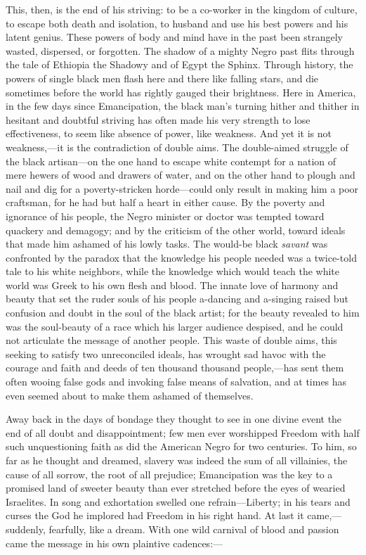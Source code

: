 This, then, is the end of his striving: to be a co-worker in the
kingdom of culture, to escape both death and isolation, to husband and
use his best powers and his latent genius. These powers of body and
mind have in the past been strangely wasted, dispersed, or forgotten.
The shadow of a mighty Negro past flits through the tale of Ethiopia
the Shadowy and of Egypt the Sphinx. Through history, the powers of
single black men flash here and there like falling stars, and die
sometimes before the world has rightly gauged their brightness. Here
in America, in the few days since Emancipation, the black man's
turning hither and thither in hesitant and doubtful striving has often
made his very strength to lose effectiveness, to seem like absence of
power, like weakness. And yet it is not weakness,---it is the
contradiction of double aims. The double-aimed struggle of the black
artisan---on the one hand to escape white contempt for a nation of
mere hewers of wood and drawers  of water, and on the other
hand to plough and nail and dig for a poverty-stricken horde---could
only result in making him a poor craftsman, for he had but half a
heart in either cause. By the poverty and ignorance of his people, the
Negro minister or doctor was tempted toward quackery and demagogy; and
by the criticism of the other world, toward ideals that made him
ashamed of his lowly tasks. The would-be black \textit{savant} was
confronted by the paradox that the knowledge his people needed was a
twice-told tale to his white neighbors, while the knowledge which
would teach the white world was Greek to his own flesh and blood. The
innate love of harmony and beauty that set the ruder souls of his
people a-dancing and a-singing raised but confusion and doubt in the
soul of the black artist; for the beauty revealed to him was the
soul-beauty of a race which his larger audience despised, and he could
not articulate the message of another people. This waste of double
aims, this seeking to satisfy two unreconciled ideals, has wrought sad
havoc with the courage and faith and deeds of ten thousand thousand
people,---has sent them often wooing false gods and invoking false
means of salvation, and at times has even seemed about to make them
ashamed of themselves.

Away back in the days of bondage they thought to see in one divine
event the end of all doubt and disappointment; few men ever worshipped
Freedom with half such unquestioning faith as did the American Negro
for two centuries. To him, so far as he thought and dreamed, slavery
was indeed the sum of all villainies, the cause of all sorrow, the
root of all  prejudice; Emancipation was the key to a promised
land of sweeter beauty than ever stretched before the eyes of wearied
Israelites. In song and exhortation swelled one refrain---Liberty; in
his tears and curses the God he implored had Freedom in his right
hand. At last it came,---suddenly, fearfully, like a dream. With one
wild carnival of blood and passion came the message in his own
plaintive cadences:---

